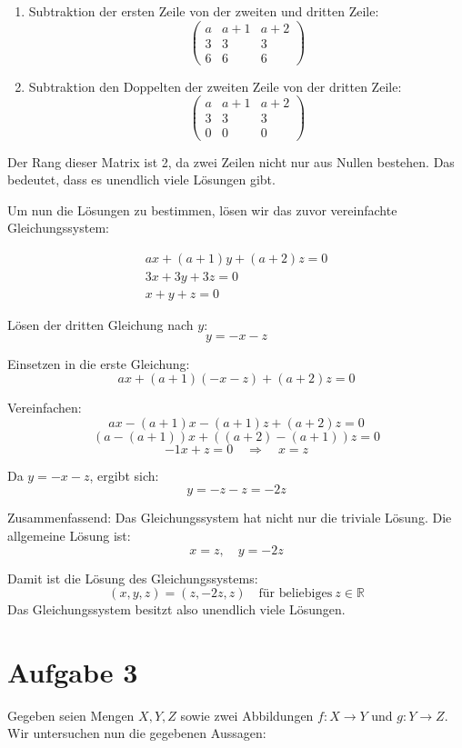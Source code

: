 \documentclass[11pt]{article}
\begin{document}
\begin{enumerate}
  \item Subtraktion der ersten Zeile von der zweiten und dritten Zeile:
  \[
  \begin{pmatrix}
  a & a+1 & a+2 \\
  3 & 3 & 3 \\
  6 & 6 & 6
  \end{pmatrix}
  \]
  \item Subtraktion den Doppelten der zweiten Zeile von der dritten Zeile:
  \[
  \begin{pmatrix}
  a & a+1 & a+2 \\
  3 & 3 & 3 \\
  0 & 0 & 0
  \end{pmatrix}
  \]
\end{enumerate}

Der Rang dieser Matrix ist 2, da zwei Zeilen nicht nur aus Nullen bestehen. Das bedeutet, dass es unendlich viele Lösungen gibt.

Um nun die Lösungen zu bestimmen, lösen wir das zuvor vereinfachte Gleichungssystem:

\[
\begin{aligned}
a x + (a+1) y + (a+2) z = 0 \\
3x + 3y + 3z = 0 \\
x + y + z = 0
\end{aligned}
\]

Lösen der dritten Gleichung nach \( y \):
\[
y = -x - z
\]

Einsetzen in die erste Gleichung:
\[
a x + (a+1) (-x - z) + (a+2) z = 0
\]

Vereinfachen:
\[
a x - (a+1) x - (a+1) z + (a+2) z = 0
\]
\[
(a - (a+1)) x + ((a+2) - (a+1)) z = 0
\]
\[
-1x + z = 0 \quad \Rightarrow \quad x = z
\]

Da \( y = -x - z \), ergibt sich:
\[
y = -z - z = -2z
\]

Zusammenfassend:
Das Gleichungssystem hat nicht nur die triviale Lösung. Die allgemeine Lösung ist:
\[
x = z, \quad y = -2z
\]

Damit ist die Lösung des Gleichungssystems:
\[
(x, y, z) = (z, -2z, z) \quad \text{für beliebiges} \ z \in \mathbb{R}
\]
Das Gleichungssystem besitzt also unendlich viele Lösungen.

\section*{Aufgabe 3}

Gegeben seien Mengen \( X, Y, Z \) sowie zwei Abbildungen \( f : X \to Y \) und \( g : Y \to Z \). Wir untersuchen nun die gegebenen Aussagen:
\end{document}
